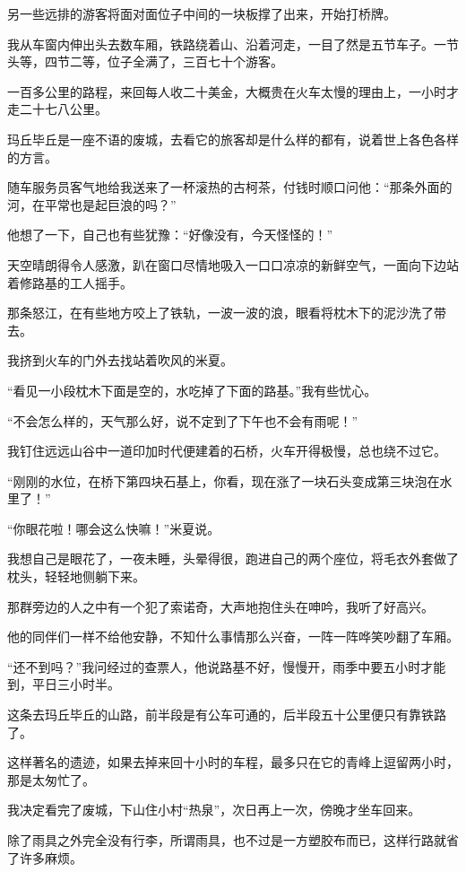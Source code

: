 \par 另一些远排的游客将面对面位子中间的一块板撑了出来，开始打桥牌。
\par 我从车窗内伸出头去数车厢，铁路绕着山、沿着河走，一目了然是五节车子。一节头等，四节二等，位子全满了，三百七十个游客。
\par 一百多公里的路程，来回每人收二十美金，大概贵在火车太慢的理由上，一小时才走二十七八公里。
\par 玛丘毕丘是一座不语的废城，去看它的旅客却是什么样的都有，说着世上各色各样的方言。
\par 随车服务员客气地给我送来了一杯滚热的古柯茶，付钱时顺口问他：“那条外面的河，在平常也是起巨浪的吗？”
\par 他想了一下，自己也有些犹豫：“好像没有，今天怪怪的！”
\par 天空晴朗得令人感激，趴在窗口尽情地吸入一口口凉凉的新鲜空气，一面向下边站着修路基的工人摇手。
\par 那条怒江，在有些地方咬上了铁轨，一波一波的浪，眼看将枕木下的泥沙洗了带去。
\par 我挤到火车的门外去找站着吹风的米夏。
\par “看见一小段枕木下面是空的，水吃掉了下面的路基。”我有些忧心。
\par “不会怎么样的，天气那么好，说不定到了下午也不会有雨呢！”
\par 我钉住远远山谷中一道印加时代便建着的石桥，火车开得极慢，总也绕不过它。
\par “刚刚的水位，在桥下第四块石基上，你看，现在涨了一块石头变成第三块泡在水里了！”
\par “你眼花啦！哪会这么快嘛！”米夏说。
\par 我想自己是眼花了，一夜未睡，头晕得很，跑进自己的两个座位，将毛衣外套做了枕头，轻轻地侧躺下来。
\par 那群旁边的人之中有一个犯了索诺奇，大声地抱住头在呻吟，我听了好高兴。
\par 他的同伴们一样不给他安静，不知什么事情那么兴奋，一阵一阵哗笑吵翻了车厢。
\par “还不到吗？”我问经过的查票人，他说路基不好，慢慢开，雨季中要五小时才能到，平日三小时半。
\par 这条去玛丘毕丘的山路，前半段是有公车可通的，后半段五十公里便只有靠铁路了。
\par 这样著名的遗迹，如果去掉来回十小时的车程，最多只在它的青峰上逗留两小时，那是太匆忙了。
\par 我决定看完了废城，下山住小村“热泉”，次日再上一次，傍晚才坐车回来。
\par 除了雨具之外完全没有行李，所谓雨具，也不过是一方塑胶布而已，这样行路就省了许多麻烦。
